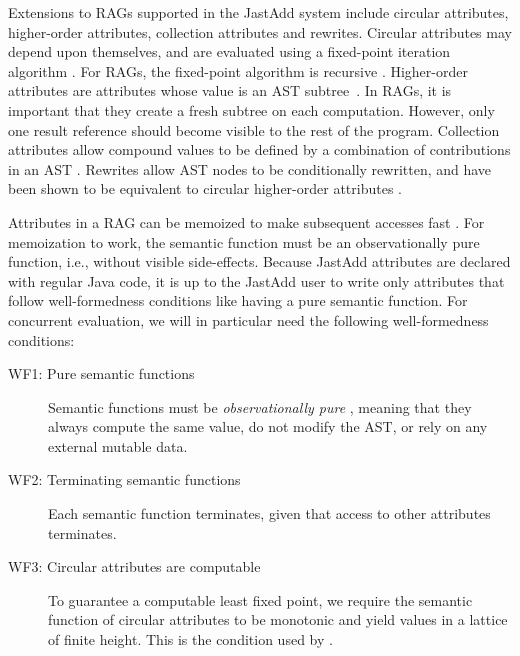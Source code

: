 {Extensions to RAGs supported in the JastAdd system include circular attributes, higher-order attributes, collection attributes and rewrites.
Circular attributes may depend upon themselves, and are evaluated using a fixed-point iteration algorithm \cite{DBLP:conf/sigplan/Farrow86}. For RAGs, the fixed-point algorithm is recursive \cite{DBLP:journals/entcs/MagnussonH03}.
Higher-order attributes are attributes whose value is an AST subtree~\cite{DBLP:conf/pldi/VogtSK89}. In RAGs, it is
important that they create a fresh subtree on each computation. However, only one
result reference should become visible to the rest of the program.
Collection attributes allow compound values to be defined by a combination of contributions in an AST \cite{DBLP:journals/jacm/Boyland05, DBLP:conf/scam/MagnussonEH07}. Rewrites allow AST nodes to be conditionally rewritten, and have been shown to be equivalent to circular higher-order attributes \cite{DBLP:journals/cl/SoderbergH15}. 

Attributes in a RAG can be memoized to make subsequent
accesses fast \cite{DBLP:conf/programm/Jourdan84, DBLP:journals/informaticaSI/Hedin00}.
For memoization to work, the semantic function must be an observationally pure function,
i.e., without visible side-effects.
Because JastAdd attributes are declared with regular Java code,
it is up to the JastAdd user to write only
attributes that follow well-formedness conditions like having a pure semantic function.
For concurrent evaluation, we will in particular need the following well-formedness conditions:

\begin{description}

\item [WF1: Pure semantic functions]
  Semantic functions must be \emph{observationally pure} \cite{DBLP:conf/fase/Naumann05},
  meaning that they always compute the same value,
  do not modify the AST, or rely on any external mutable data.

\item [WF2: Terminating semantic functions]
  Each semantic function terminates, given that access to other attributes terminates.

\item [WF3: Circular attributes are computable]
  To guarantee a computable
  least fixed point, we require the semantic function of circular attributes to
  be monotonic and yield values in a lattice of finite height. This is the
  condition used by \textcite{DBLP:journals/toplas/Jones90}.


\end{description}}
